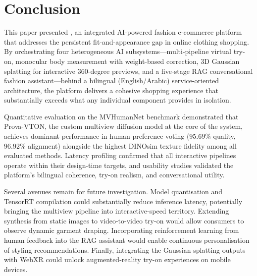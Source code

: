 \section{Conclusion}

This paper presented \projectname{}, an integrated AI-powered fashion e-commerce platform that addresses the persistent fit-and-appearance gap in online clothing shopping. By orchestrating four heterogeneous AI subsystems---multi-pipeline virtual try-on, monocular body measurement with weight-based correction, 3D Gaussian splatting for interactive 360-degree previews, and a five-stage RAG conversational fashion assistant---behind a bilingual (English/Arabic) service-oriented architecture, the platform delivers a cohesive shopping experience that substantially exceeds what any individual component provides in isolation.

Quantitative evaluation on the MVHumanNet benchmark demonstrated that Prova-VTON, the custom multiview diffusion model at the core of the system, achieves dominant performance in human-preference voting (95.69\% quality, 96.92\% alignment) alongside the highest DINOsim texture fidelity among all evaluated methods. Latency profiling confirmed that all interactive pipelines operate within their design-time targets, and usability studies validated the platform's bilingual coherence, try-on realism, and conversational utility.

Several avenues remain for future investigation. Model quantisation and TensorRT compilation could substantially reduce inference latency, potentially bringing the multiview pipeline into interactive-speed territory. Extending synthesis from static images to video-to-video try-on would allow consumers to observe dynamic garment draping. Incorporating reinforcement learning from human feedback into the RAG assistant would enable continuous personalisation of styling recommendations. Finally, integrating the Gaussian splatting outputs with WebXR could unlock augmented-reality try-on experiences on mobile devices.
